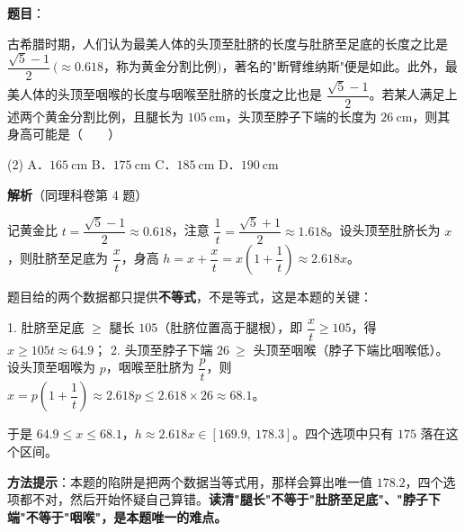\begin{answer}

\textbf{题目}：

古希腊时期，人们认为最美人体的头顶至肚脐的长度与肚脐至足底的长度之比是 $\dfrac{\sqrt5-1}2\ (\approx0.618$，称为黄金分割比例$)$，著名的"断臂维纳斯"便是如此。此外，最美人体的头顶至咽喉的长度与咽喉至肚脐的长度之比也是 $\dfrac{\sqrt5-1}2$。若某人满足上述两个黄金分割比例，且腿长为 $105\ \mathrm{cm}$，头顶至脖子下端的长度为 $26\ \mathrm{cm}$，则其身高可能是\mbox{（　　）}

\begin{gkopts}(2)
\task A．$165\ \mathrm{cm}$
\task B．$175\ \mathrm{cm}$
\task C．$185\ \mathrm{cm}$
\task D．$190\ \mathrm{cm}$
\end{gkopts}

\textbf{解析}（同理科卷第 4 题）

记黄金比 $t=\dfrac{\sqrt5-1}2\approx0.618$，注意 $\dfrac1t=\dfrac{\sqrt5+1}2\approx1.618$。设头顶至肚脐长为 $x$，则肚脐至足底为 $\dfrac xt$，身高 $h=x+\dfrac xt=x\left(1+\dfrac1t\right)\approx2.618x$。

题目给的两个数据都只提供\textbf{不等式}，不是等式，这是本题的关键：

1. 肚脐至足底 $\ge$ 腿长 $105$（肚脐位置高于腿根），即 $\dfrac xt\ge105$，得 $x\ge105t\approx64.9$；
2. 头顶至脖子下端 $26\ \ge$ 头顶至咽喉（脖子下端比咽喉低）。设头顶至咽喉为 $p$，咽喉至肚脐为 $\dfrac pt$，则 $x=p\left(1+\dfrac1t\right)\approx2.618p\le2.618\times26\approx68.1$。

于是 $64.9\le x\le68.1$，$h\approx2.618x\in[169.9,\ 178.3]$。四个选项中只有 $175$ 落在这个区间。

\begin{gktip}
\textbf{方法提示}：本题的陷阱是把两个数据当等式用，那样会算出唯一值 $178.2$，四个选项都不对，然后开始怀疑自己算错。\textbf{读清"腿长"不等于"肚脐至足底"、"脖子下端"不等于"咽喉"，是本题唯一的难点。}
\end{gktip}


\par\medskip

\end{answer}
